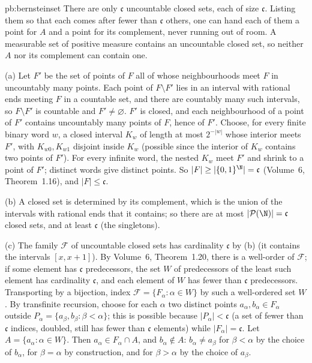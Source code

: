 \begin{solution}{pb:bernsteinset}
\idea There are only $\mathfrak c$ uncountable closed sets, each of size $\mathfrak c$. Listing them so that each comes after fewer than $\mathfrak c$ others, one can
hand each of them a point for $A$ and a point for its complement, never running out of room. A measurable set of positive measure contains an uncountable
closed set, so neither $A$ nor its complement can contain one.

\writeup (a) Let $F'$ be the set of points of $F$ all of whose neighbourhoods meet $F$ in uncountably many points. Each point of $F\setminus F'$ lies in an interval with
rational ends meeting $F$ in a countable set, and there are countably many such intervals, so $F\setminus F'$ is countable and $F'\ne\varnothing$. $F'$ is closed, and
each neighbourhood of a point of $F'$ contains uncountably many points of $F$, hence of $F'$. Choose, for every finite binary word $w$, a closed interval $K_w$ of length at
most $2^{-|w|}$ whose interior meets $F'$, with $K_{w0},K_{w1}$ disjoint inside $K_w$ (possible since the interior of $K_w$ contains two points of $F'$). For every infinite
word, the nested $K_w$ meet $F'$ and shrink to a point of $F'$; distinct words give distinct points. So $|F|\ge|\{0,1\}^\N|=\mathfrak c$ (Volume~6, Theorem~1.16), and $|F|\le\mathfrak c$.

(b) A closed set is determined by its complement, which is the union of the intervals with rational ends that it contains; so there are at most $|\mathcal P(\N)|=\mathfrak c$
closed sets, and at least $\mathfrak c$ (the singletons).

(c) The family $\mathcal F$ of uncountable closed sets has cardinality $\mathfrak c$ by (b) (it contains the intervals $[x,x+1]$). By Volume~6, Theorem~1.20, there is a well-order of
$\mathcal F$; if some element has $\mathfrak c$ predecessors, the set $W$ of predecessors of the least such element has cardinality $\mathfrak c$, and each element of $W$ has fewer
than $\mathfrak c$ predecessors. Transporting by a bijection, index $\mathcal F=\{F_\alpha:\alpha\in W\}$ by such a well-ordered set $W$. By transfinite recursion, choose for each
$\alpha$ two distinct points $a_\alpha,b_\alpha\in F_\alpha$ outside $P_\alpha=\{a_\beta,b_\beta:\beta<\alpha\}$; this is possible because $|P_\alpha|<\mathfrak c$ (a set of fewer than
$\mathfrak c$ indices, doubled, still has fewer than $\mathfrak c$ elements) while $|F_\alpha|=\mathfrak c$. Let $A=\{a_\alpha:\alpha\in W\}$. Then $a_\alpha\in F_\alpha\cap A$, and
$b_\alpha\notin A$: $b_\alpha\ne a_\beta$ for $\beta<\alpha$ by the choice of $b_\alpha$, for $\beta=\alpha$ by construction, and for $\beta>\alpha$ by the choice of $a_\beta$.


\end{solution}
